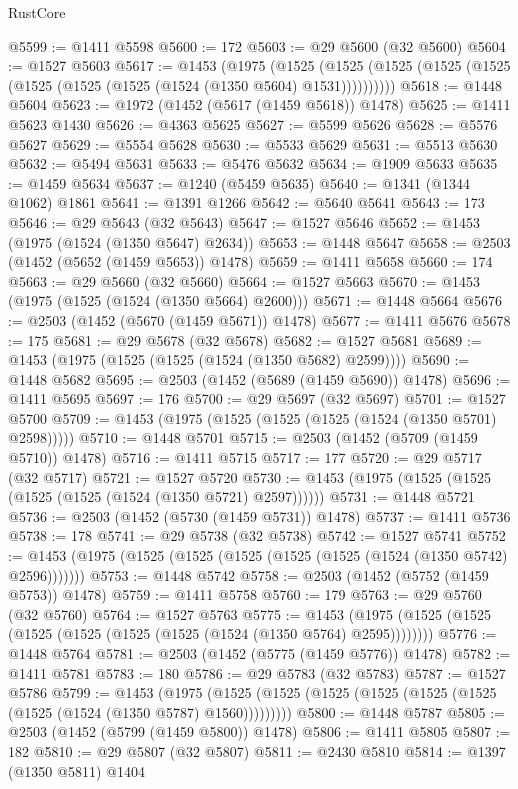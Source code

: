 \begin{lexlean}{RustCore}
\begin{coremodule}
{\begin{coremodule}
{{{{{{{{{{{{{{{{{{{{{{{{{{{{{{{{{{{{{{{{{{{{{@5599 := @1411 @5598
@5600 := 172
@5603 := @29 @5600 (@32 @5600)
@5604 := @1527 @5603
@5617 := @1453
    (@1975
      (@1525 (@1525 (@1525 (@1525 (@1525 (@1525 (@1525 (@1525 (@1524 (@1350 @5604) @1531))))))))))
@5618 := @1448 @5604
@5623 := @1972 (@1452 (@5617 (@1459 @5618)) @1478)
@5625 := @1411 @5623 @1430
@5626 := @4363 @5625
@5627 := @5599 @5626
@5628 := @5576 @5627
@5629 := @5554 @5628
@5630 := @5533 @5629
@5631 := @5513 @5630
@5632 := @5494 @5631
@5633 := @5476 @5632
@5634 := @1909 @5633
@5635 := @1459 @5634
@5637 := @1240 (@5459 @5635)
@5640 := @1341 (@1344 @1062) @1861
@5641 := @1391 @1266
@5642 := @5640 @5641
@5643 := 173
@5646 := @29 @5643 (@32 @5643)
@5647 := @1527 @5646
@5652 := @1453 (@1975 (@1524 (@1350 @5647) @2634))
@5653 := @1448 @5647
@5658 := @2503 (@1452 (@5652 (@1459 @5653)) @1478)
@5659 := @1411 @5658
@5660 := 174
@5663 := @29 @5660 (@32 @5660)
@5664 := @1527 @5663
@5670 := @1453 (@1975 (@1525 (@1524 (@1350 @5664) @2600)))
@5671 := @1448 @5664
@5676 := @2503 (@1452 (@5670 (@1459 @5671)) @1478)
@5677 := @1411 @5676
@5678 := 175
@5681 := @29 @5678 (@32 @5678)
@5682 := @1527 @5681
@5689 := @1453 (@1975 (@1525 (@1525 (@1524 (@1350 @5682) @2599))))
@5690 := @1448 @5682
@5695 := @2503 (@1452 (@5689 (@1459 @5690)) @1478)
@5696 := @1411 @5695
@5697 := 176
@5700 := @29 @5697 (@32 @5697)
@5701 := @1527 @5700
@5709 := @1453 (@1975 (@1525 (@1525 (@1525 (@1524 (@1350 @5701) @2598)))))
@5710 := @1448 @5701
@5715 := @2503 (@1452 (@5709 (@1459 @5710)) @1478)
@5716 := @1411 @5715
@5717 := 177
@5720 := @29 @5717 (@32 @5717)
@5721 := @1527 @5720
@5730 := @1453 (@1975 (@1525 (@1525 (@1525 (@1525 (@1524 (@1350 @5721) @2597))))))
@5731 := @1448 @5721
@5736 := @2503 (@1452 (@5730 (@1459 @5731)) @1478)
@5737 := @1411 @5736
@5738 := 178
@5741 := @29 @5738 (@32 @5738)
@5742 := @1527 @5741
@5752 := @1453 (@1975 (@1525 (@1525 (@1525 (@1525 (@1525 (@1524 (@1350 @5742) @2596)))))))
@5753 := @1448 @5742
@5758 := @2503 (@1452 (@5752 (@1459 @5753)) @1478)
@5759 := @1411 @5758
@5760 := 179
@5763 := @29 @5760 (@32 @5760)
@5764 := @1527 @5763
@5775 := @1453 (@1975 (@1525 (@1525 (@1525 (@1525 (@1525 (@1525 (@1524 (@1350 @5764) @2595))))))))
@5776 := @1448 @5764
@5781 := @2503 (@1452 (@5775 (@1459 @5776)) @1478)
@5782 := @1411 @5781
@5783 := 180
@5786 := @29 @5783 (@32 @5783)
@5787 := @1527 @5786
@5799 := @1453
    (@1975 (@1525 (@1525 (@1525 (@1525 (@1525 (@1525 (@1525 (@1524 (@1350 @5787) @1560)))))))))
@5800 := @1448 @5787
@5805 := @2503 (@1452 (@5799 (@1459 @5800)) @1478)
@5806 := @1411 @5805
@5807 := 182
@5810 := @29 @5807 (@32 @5807)
@5811 := @2430 @5810
@5814 := @1397 (@1350 @5811) @1404
}}}}}}}}}}}}}}}}}}}}}}}}}}}}}}}}}}}}}}}}}}}}}
\end{coremodule}}
\end{coremodule}
\end{lexlean}
